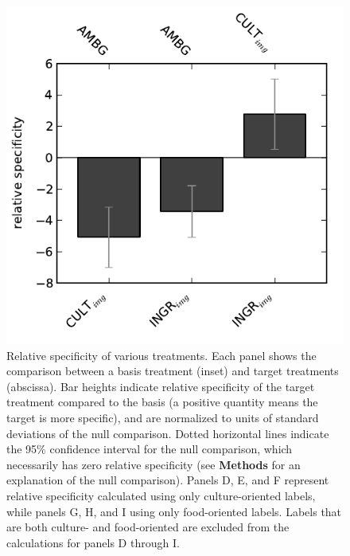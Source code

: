 \documentclass[a4paper]{report}
\begin{document}
\begin{figure}
	\includegraphics{../figs/specificity-allImages.pdf}
	\caption{Relative specificity of various treatments.
		Each panel shows the comparison between a basis treatment (inset) and 
		target treatments (abscissa).
		Bar heights indicate relative specificity of the target 
		treatment compared to the basis (a positive quantity means the target 
		is more specific), and are normalized to units of standard 
		deviations of the null comparison.  Dotted horizontal lines indicate
		the 95\% confidence interval for the null comparison, which necessarily
		has zero relative specificity (see \textbf{Methods} 
		for an explanation of the null comparison).  Panels D, E, and F 
		represent relative specificity calculated using only culture-oriented
		labels, while panels G, H, and I using only food-oriented labels.
		Labels that are both culture- and food-oriented are excluded from the
		calculations for panels D through I.
		}
\end{figure}
\end{document}
